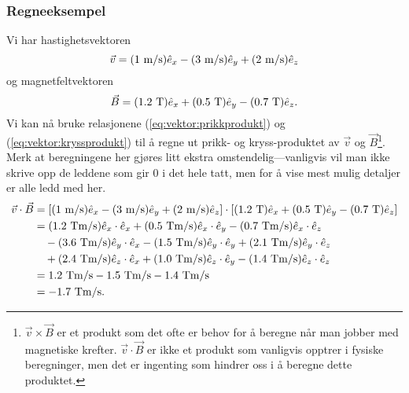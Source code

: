 \subsubsection{Regneeksempel}
Vi har hastighetsvektoren
\begin{displaymath}
	\vec{v} = (1~\mathrm{m/s})\hat{e}_x - (3~\mathrm{m/s})\hat{e}_y + (2~\mathrm{m/s})\hat{e}_z
\end{displaymath}
og magnetfeltvektoren 
\begin{displaymath}
	\vec{B} = (1.2~\mathrm{T})\hat{e}_x + (0.5~\mathrm{T})\hat{e}_y - (0.7~\mathrm{T})\hat{e}_z.
\end{displaymath}
Vi kan nå bruke relasjonene (\ref{eq:vektor:prikkprodukt}) og (\ref{eq:vektor:kryssprodukt}) til å regne ut prikk- og kryss-produktet av $\vec{v}$ og $\vec{B}$\footnote{$\vec{v}\times\vec{B}$ er et produkt som det ofte er behov for å beregne når man jobber med magnetiske krefter. $\vec{v}\cdot\vec{B}$ er ikke et produkt som vanligvis opptrer i fysiske beregninger, men det er ingenting som hindrer oss i å beregne dette produktet.}. Merk at beregningene her gjøres litt ekstra omstendelig---vanligvis vil man ikke skrive opp de leddene som gir 0 i det hele tatt, men for å vise mest mulig detaljer er alle ledd med her.
\begin{displaymath}
\begin{aligned}
	\vec{v}\cdot\vec{B} &= \left[ (1~\mathrm{m/s})\hat{e}_x - (3~\mathrm{m/s})\hat{e}_y + (2~\mathrm{m/s})\hat{e}_z \right] \cdot
	\left[(1.2~\mathrm{T})\hat{e}_x + (0.5~\mathrm{T})\hat{e}_y - (0.7~\mathrm{T})\hat{e}_z\right] \\
	&= (1.2~\mathrm{Tm/s})\hat{e}_x\cdot\hat{e}_x + (0.5~\mathrm{Tm/s})\hat{e}_x\cdot\hat{e}_y -  (0.7~\mathrm{Tm/s})\hat{e}_x\cdot\hat{e}_z \\
	&\quad- (3.6~\mathrm{Tm/s})\hat{e}_y\cdot\hat{e}_x- (1.5~\mathrm{Tm/s})\hat{e}_y\cdot\hat{e}_y+ (2.1~\mathrm{Tm/s})\hat{e}_y\cdot\hat{e}_z \\
	&\quad+ (2.4~\mathrm{Tm/s})\hat{e}_z\cdot\hat{e}_x+ (1.0~\mathrm{Tm/s})\hat{e}_z\cdot\hat{e}_y -  (1.4~\mathrm{Tm/s})\hat{e}_z\cdot\hat{e}_z \\
	&= 1.2~\mathrm{Tm/s} - 1.5~\mathrm{Tm/s} - 1.4~\mathrm{Tm/s} \\
	&= -1.7~\mathrm{Tm/s}.
\end{aligned}
\end{displaymath}
